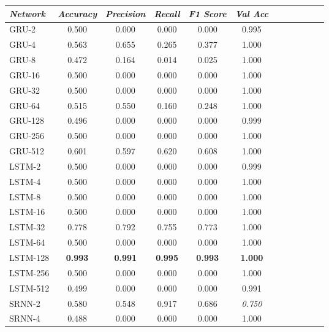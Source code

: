\begin{table}[t]
\begin{tabularx}{\textwidth}{@{}l*{10}{C}c@{}}
\toprule
  \textit{Network} &  \textit{Accuracy} &  \textit{Precision} &  \textit{Recall} &  \textit{F1 Score} &  \textit{Val Acc} \\
 \midrule
    GRU-2 &     0.500 &      0.000 &   0.000 &     0.000 &    0.995 \\
    GRU-4 &     0.563 &      0.655 &   0.265 &     0.377 &    1.000 \\
    GRU-8 &     0.472 &      0.164 &   0.014 &     0.025 &    1.000 \\
   GRU-16 &     0.500 &      0.000 &   0.000 &     0.000 &    1.000 \\
   GRU-32 &     0.500 &      0.000 &   0.000 &     0.000 &    1.000 \\
   GRU-64 &     0.515 &      0.550 &   0.160 &     0.248 &    1.000 \\
  GRU-128 &     0.496 &      0.000 &   0.000 &     0.000 &    0.999 \\
  GRU-256 &     0.500 &      0.000 &   0.000 &     0.000 &    1.000 \\
  GRU-512 &     0.601 &      0.597 &   0.620 &     0.608 &    1.000 \\
   LSTM-2 &     0.500 &      0.000 &   0.000 &     0.000 &    0.999 \\
   LSTM-4 &     0.500 &      0.000 &   0.000 &     0.000 &    1.000 \\
   LSTM-8 &     0.500 &      0.000 &   0.000 &     0.000 &    1.000 \\
  LSTM-16 &     0.500 &      0.000 &   0.000 &     0.000 &    1.000 \\
  LSTM-32 &     0.778 &      0.792 &   0.755 &     0.773 &    1.000 \\
  LSTM-64 &     0.500 &      0.000 &   0.000 &     0.000 &    1.000 \\
 LSTM-128 &     \textbf{0.993} &      \textbf{0.991} &   \textbf{0.995} &     \textbf{0.993} &    \textbf{1.000} \\
 LSTM-256 &     0.500 &      0.000 &   0.000 &     0.000 &    1.000 \\
 LSTM-512 &     0.499 &      0.000 &   0.000 &     0.000 &    0.991 \\
   SRNN-2 &     0.580 &      0.548 &   0.917 &     0.686 &    \textit{0.750} \\
   SRNN-4 &     0.488 &      0.000 &   0.000 &     0.000 &    1.000 \\

\end{tabularx}
\end{table}

